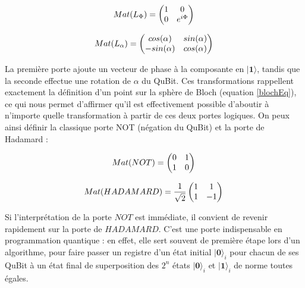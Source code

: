 \documentclass[a4paper,12pt]{report}
\newcommand{\quSt}[1]{\bm{|#1\rangle}}
\begin{document}
\begin{equation}
	 Mat(L_{\Phi}) = \left( \begin{matrix} 1 & 0 \\ 0 & e^{i\Phi} \end{matrix} \right ) \\
\end{equation}

\begin{equation}
	 Mat(L_{\alpha}) = \left( \begin{matrix} cos(\alpha) & sin(\alpha) \\ -sin(\alpha) & cos(\alpha) \end{matrix} \right ) \\
\end{equation}

\vspace{1\baselineskip}

\par{
	La première porte ajoute un vecteur de phase à la composante en $\quSt{1}$, tandis que la seconde effectue une rotation de $\alpha$ du QuBit. Ces transformations rappellent exactement la définition d'un point sur la sphère de Bloch (equation \ref{blochEq}), ce qui nous permet d'affirmer qu'il est effectivement possible d'aboutir à n'importe quelle transformation à partir de ces deux portes logiques. On peux ainsi définir la classique porte NOT (négation du QuBit) et la porte de Hadamard :
}

\begin{equation}
	 Mat(NOT) = \left( \begin{matrix} 0 & 1 \\ 1 & 0 \end{matrix} \right ) \\
\end{equation}

\begin{equation}
	 Mat(HADAMARD) = \frac{1}{\sqrt{2}} \left( \begin{matrix} 1 & 1 \\ 1 & -1 \end{matrix} \right ) \\
\end{equation}

\vspace{1\baselineskip}

\par{
	Si l'interprétation de la porte $NOT$ est immédiate, il convient de revenir rapidement sur la porte de $HADAMARD$. C'est une porte indispensable en programmation quantique : en effet, elle sert souvent de première étape lors d'un algorithme, pour faire passer un registre d'un état initial $\quSt{0}_i$ pour chacun de ses QuBit à un état final de superposition des $2^n$ états $\quSt{0}_i$ et $\quSt{1}_i$ de norme toutes égales.
}
\end{document}
